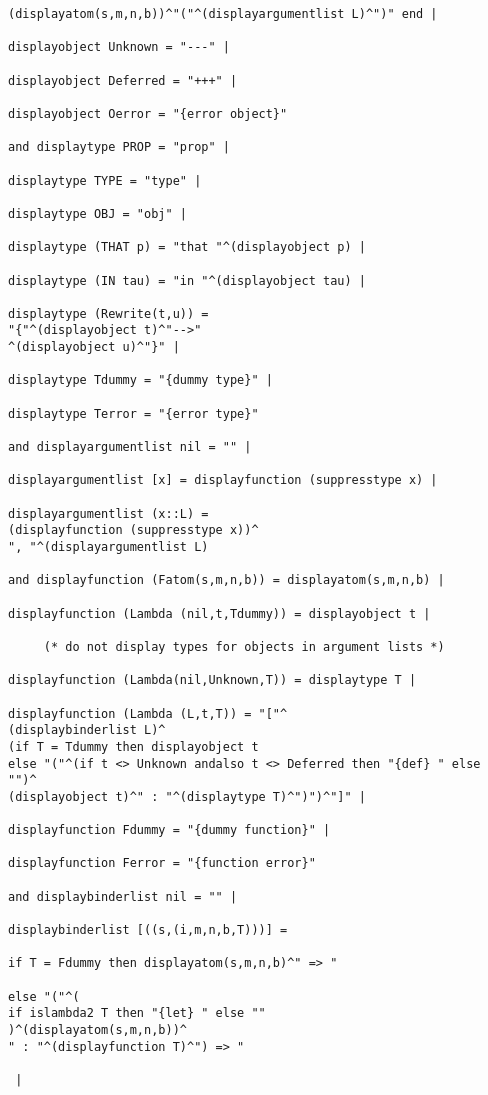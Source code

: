 \documentclass[12pt]{article}
\begin{document}
\begin{verbatim}
(displayatom(s,m,n,b))^"("^(displayargumentlist L)^")" end |

displayobject Unknown = "---" |

displayobject Deferred = "+++" |

displayobject Oerror = "{error object}"

and displaytype PROP = "prop" |

displaytype TYPE = "type" |

displaytype OBJ = "obj" |

displaytype (THAT p) = "that "^(displayobject p) |

displaytype (IN tau) = "in "^(displayobject tau) |

displaytype (Rewrite(t,u)) = 
"{"^(displayobject t)^"-->"
^(displayobject u)^"}" |

displaytype Tdummy = "{dummy type}" |

displaytype Terror = "{error type}"

and displayargumentlist nil = "" |

displayargumentlist [x] = displayfunction (suppresstype x) |

displayargumentlist (x::L) = 
(displayfunction (suppresstype x))^
", "^(displayargumentlist L) 

and displayfunction (Fatom(s,m,n,b)) = displayatom(s,m,n,b) |

displayfunction (Lambda (nil,t,Tdummy)) = displayobject t |

     (* do not display types for objects in argument lists *)
	 
displayfunction (Lambda(nil,Unknown,T)) = displaytype T |
	 
displayfunction (Lambda (L,t,T)) = "["^
(displaybinderlist L)^
(if T = Tdummy then displayobject t
else "("^(if t <> Unknown andalso t <> Deferred then "{def} " else "")^
(displayobject t)^" : "^(displaytype T)^")")^"]" |

displayfunction Fdummy = "{dummy function}" |

displayfunction Ferror = "{function error}"

and displaybinderlist nil = "" |

displaybinderlist [((s,(i,m,n,b,T)))] = 

if T = Fdummy then displayatom(s,m,n,b)^" => "

else "("^(
if islambda2 T then "{let} " else ""
)^(displayatom(s,m,n,b))^
" : "^(displayfunction T)^") => "

 |


\end{verbatim}
\end{document}
